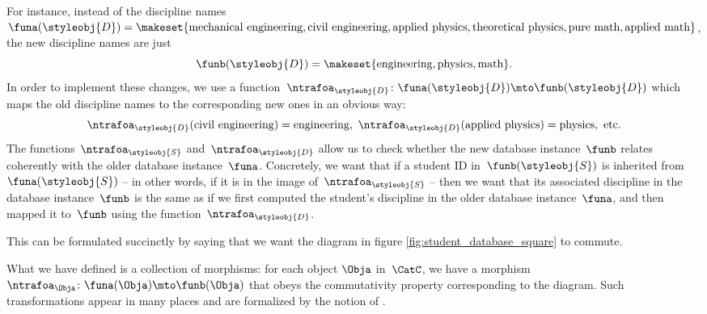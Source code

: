 For instance, instead of the discipline names~$\funa(\styleobj{D}) = \makeset{ \text{mechanical engineering},  \text{civil}\ \text{engineering}, \text{applied}\ \text{physics}, \text{theoretical}\ \text{physics}, \text{pure}\ \text{math}, \linebreak[1]\text{applied}\ \text{math} }$, the new discipline names are just
%
\begin{equation}
    \funb(\styleobj{D}) = \makeset{ \text{engineering}, \text{physics}, \text{math} }.
\end{equation}
%
In order to implement these changes, we use a function~$\ntrafoa_{\styleobj{D}}\colon \funa(\styleobj{D}) \mto \funb(\styleobj{D})$ which maps the old discipline names to the corresponding new ones in an obvious way:
\begin{equation}
    \ntrafoa_{\styleobj{D}}(\text{civil engineering}) = \text{engineering}, \ \ntrafoa_{\styleobj{D}}(\text{applied physics}) = \text{physics}, \ \text{etc.}
\end{equation}
The functions~$\ntrafoa_\styleobj{S}$ and~$\ntrafoa_\styleobj{D}$ allow us to check whether the new database instance~$\funb$ relates coherently with the older database instance~$\funa$.
Concretely, we want that if a student ID in~$\funb(\styleobj{S})$ is inherited from~$\funa(\styleobj{S})$ -- in other words, if it is in the image of~$\ntrafoa_{\styleobj{S}}$ --  then we want that its associated discipline in the database instance~$\funb$ is the same as if we first computed the student's discipline in the older database instance~$\funa$, and then mapped it to~$\funb$ using the function~$\ntrafoa_{\styleobj{D}}$.

%
\begin{marginfigure}
    \centering
    \caption{}
    \label{fig:student_database_square}
\end{marginfigure}
%

This can be formulated succinctly by saying that we want the diagram in figure \cref{fig:student_database_square} to commute.

What we have defined is a collection of morphisms: for each object $\Obja$ in~$\CatC$, we have a morphism~$\ntrafoa_\Obja \colon \funa(\Obja) \mto \funb(\Obja)$ that obeys the commutativity property corresponding to the diagram.
Such transformations appear in many places and are formalized by the notion of .

